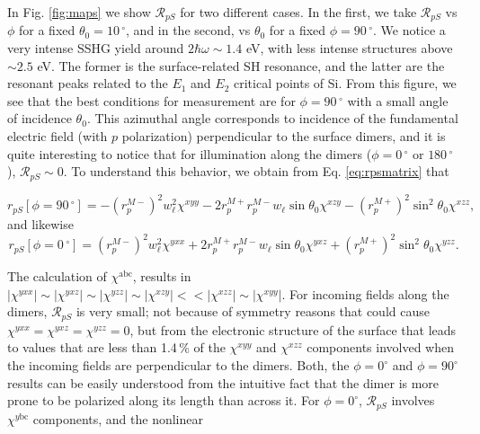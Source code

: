 \documentclass[aps,prb,10pt,showpacs,letterpaper,twocolumn]{revtex4-1}
\begin{document}
In Fig. \ref{fig:maps} we show $\mathcal{R}_{pS}$ for two different cases. In
the first, we take $\mathcal{R}_{pS}$ vs $\phi$ for a fixed $\theta_{0} =
10\,^{\circ}$, and in the second, vs $\theta_{0}$ for a fixed $\phi =
90\,^{\circ}$. We notice a very intense SSHG yield around $2\hbar\omega\sim 1.4$
eV, with less intense structures above $\sim 2.5$ eV. The former is the
surface-related SH resonance, and the latter are the resonant peaks related to
the $E_{1}$ and $E_{2}$ critical points of Si. From this figure, we see that the
best conditions for measurement are for $\phi = 90\,^{\circ}$ with a small angle
of incidence $\theta_{0}$. This azimuthal angle corresponds to incidence of the
fundamental electric field (with $p$ polarization) perpendicular to the surface
dimers, and it is quite interesting to notice that for illumination along the
dimers ($\phi = 0\,^{\circ}$ or $180\,^{\circ}$), $\mathcal{R}_{pS}\sim 0$. To
understand this behavior, we obtain from Eq. \eqref{eq:rpsmatrix} that
\begin{widetext}
\begin{equation}\label{eq:001rps90}
r_{pS}[\phi=90\,^{\circ}] =
- \left(r^{M-}_{p}\right)^{2}w^{2}_{\ell}\chi^{xyy}
- 2r^{M+}_{p}r^{M-}_{p}w_{\ell}\sin\theta_{0}\chi^{xzy}
- \left(r^{M+}_{p}\right)^{2}\sin^{2}\theta_{0}\chi^{xzz},
\end{equation}
and likewise
\begin{equation}\label{eq:001rps0}
r_{pS}[\phi=0\,^{\circ}] =
\left(r^{M-}_{p}\right)^{2}w^{2}_{\ell}\chi^{yxx}
+ 2r^{M+}_{p}r^{M-}_{p}w_{\ell}\sin\theta_{0}\chi^{yxz}
+ \left(r^{M+}_{p}\right)^{2}\sin^{2}\theta_{0}\chi^{yzz}.  
\end{equation}
\end{widetext}
The calculation of $\chi^{\mathrm{abc}}$,\cite{andersonPRB15} results in
$|\chi^{yxx}|\sim |\chi^{yxz}|\sim |\chi^{yzz}|\sim |\chi^{xzy}|<<
|\chi^{xzz}|\sim |\chi^{xyy}|$. For incoming fields along the dimers,
$\mathcal{R}_{pS}$ is very small; not because of symmetry reasons that could
cause $\chi^{yxx} = \chi^{yxz} = \chi^{yzz} = 0$, but from the electronic
structure of the surface that leads to values that are less than 1.4\,\% of the
$\chi^{xyy}$ and $\chi^{xzz}$ components involved when the incoming fields are
perpendicular to the dimers. Both, the $\phi=0^\circ$ and $\phi=90^\circ$
results can be  easily understood from the intuitive fact that the dimer is more
prone to be polarized along its length than across it.  For $\phi=0^\circ$,
$\mathcal{R}_{pS}$ involves $\chi^{y\mathrm{bc}}$ components, and the nonlinear
\end{document}
